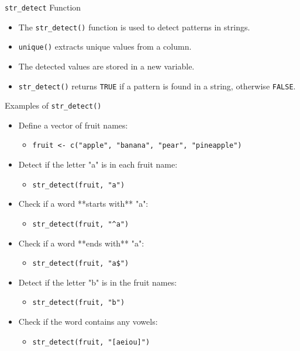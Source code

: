 \documentclass{beamer}
\begin{document}
\begin{frame}{\texttt{str\_detect} Function}
    \begin{itemize}
        
        \item The \texttt{str\_detect()} function is used to detect patterns in strings.
        \item \texttt{unique()} extracts unique values from a column.
        \item The detected values are stored in a new variable.
        \item \texttt{str\_detect()} returns \texttt{TRUE} if a pattern is found in a string, otherwise \texttt{FALSE}.
    \end{itemize}
\end{frame}

\begin{frame}{Examples of \texttt{str\_detect()}}
    \begin{itemize}
        \item Define a vector of fruit names:
        \begin{itemize}
            \item \texttt{fruit <- c("apple", "banana", "pear", "pineapple")}
        \end{itemize}
        \item Detect if the letter "a" is in each fruit name:
        \begin{itemize}
            \item \texttt{str\_detect(fruit, "a")}
        \end{itemize}
        \item Check if a word **starts with** "a":
        \begin{itemize}
            \item \texttt{str\_detect(fruit, "\string^a")}
        \end{itemize}
        \item Check if a word **ends with** "a":
        \begin{itemize}
            \item \texttt{str\_detect(fruit, "a\$")}
        \end{itemize}
        \item Detect if the letter "b" is in the fruit names:
        \begin{itemize}
            \item \texttt{str\_detect(fruit, "b")}
        \end{itemize}
        \item Check if the word contains any vowels:
        \begin{itemize}
            \item \texttt{str\_detect(fruit, "[aeiou]")}
        \end{itemize}
    \end{itemize}
\end{frame}
\end{document}
